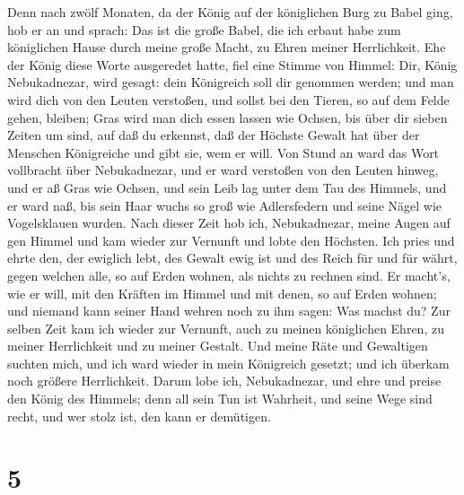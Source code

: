  Denn nach zwölf Monaten, da der König auf der königlichen
Burg zu Babel ging,  hob er an und sprach: Das ist die
große Babel, die ich erbaut habe zum königlichen Hause durch meine große
Macht, zu Ehren meiner Herrlichkeit.  Ehe der König diese
Worte ausgeredet hatte, fiel eine Stimme von Himmel: Dir, König
Nebukadnezar, wird gesagt: dein Königreich soll dir genommen werden;
 und man wird dich von den Leuten verstoßen, und sollst bei
den Tieren, so auf dem Felde gehen, bleiben; Gras wird man dich essen
lassen wie Ochsen, bis über dir sieben Zeiten um sind, auf daß du
erkennst, daß der Höchste Gewalt hat über der Menschen Königreiche und
gibt sie, wem er will.  Von Stund an ward das Wort
vollbracht über Nebukadnezar, und er ward verstoßen von den Leuten
hinweg, und er aß Gras wie Ochsen, und sein Leib lag unter dem Tau des
Himmels, und er ward naß, bis sein Haar wuchs so groß wie Adlersfedern
und seine Nägel wie Vogelsklauen wurden.  Nach dieser Zeit
hob ich, Nebukadnezar, meine Augen auf gen Himmel und kam wieder zur
Vernunft und lobte den Höchsten. Ich pries und ehrte den, der ewiglich
lebt, des Gewalt ewig ist und des Reich für und für währt, 
gegen welchen alle, so auf Erden wohnen, als nichts zu rechnen sind. Er
macht's, wie er will, mit den Kräften im Himmel und mit denen, so auf
Erden wohnen; und niemand kann seiner Hand wehren noch zu ihm sagen: Was
machst du?  Zur selben Zeit kam ich wieder zur Vernunft,
auch zu meinen königlichen Ehren, zu meiner Herrlichkeit und zu meiner
Gestalt. Und meine Räte und Gewaltigen suchten mich, und ich ward wieder
in mein Königreich gesetzt; und ich überkam noch größere Herrlichkeit.
 Darum lobe ich, Nebukadnezar, und ehre und preise den
König des Himmels; denn all sein Tun ist Wahrheit, und seine Wege sind
recht, und wer stolz ist, den kann er demütigen.

\hypertarget{section-4}{%
\section{5}\label{section-4}}


